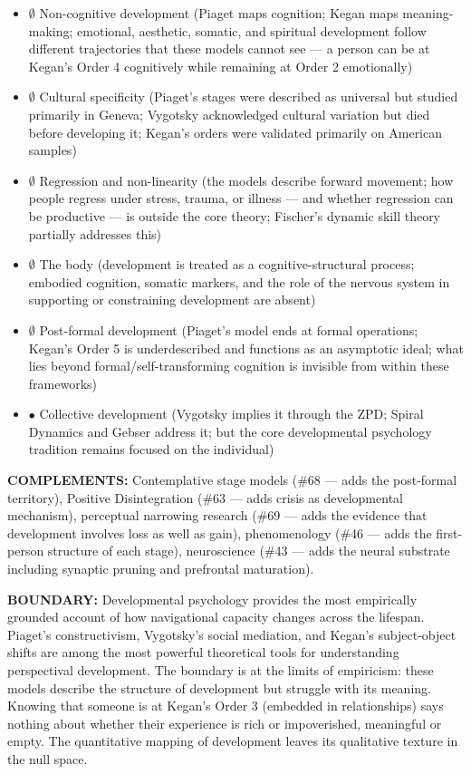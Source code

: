 \begin{itemize}[nosep,leftmargin=*]
  \item $\emptyset$ Non-cognitive development (Piaget maps cognition; Kegan maps meaning-making; emotional, aesthetic, somatic, and spiritual development follow different trajectories that these models cannot see — a person can be at Kegan's Order 4 cognitively while remaining at Order 2 emotionally)
  \item $\emptyset$ Cultural specificity (Piaget's stages were described as universal but studied primarily in Geneva; Vygotsky acknowledged cultural variation but died before developing it; Kegan's orders were validated primarily on American samples)
  \item $\emptyset$ Regression and non-linearity (the models describe forward movement; how people regress under stress, trauma, or illness — and whether regression can be productive — is outside the core theory; Fischer's dynamic skill theory partially addresses this)
  \item $\emptyset$ The body (development is treated as a cognitive-structural process; embodied cognition, somatic markers, and the role of the nervous system in supporting or constraining development are absent)
  \item $\emptyset$ Post-formal development (Piaget's model ends at formal operations; Kegan's Order 5 is underdescribed and functions as an asymptotic ideal; what lies beyond formal/self-transforming cognition is invisible from within these frameworks)
  \item $\bullet$ Collective development (Vygotsky implies it through the ZPD; Spiral Dynamics and Gebser address it; but the core developmental psychology tradition remains focused on the individual)
\end{itemize}


\textbf{COMPLEMENTS:} Contemplative stage models (\#68 — adds the post-formal territory), Positive Disintegration (\#63 — adds crisis as developmental mechanism), perceptual narrowing research (\#69 — adds the evidence that development involves loss as well as gain), phenomenology (\#46 — adds the first-person structure of each stage), neuroscience (\#43 — adds the neural substrate including synaptic pruning and prefrontal maturation).


\textbf{BOUNDARY:} Developmental psychology provides the most empirically grounded account of how navigational capacity changes across the lifespan. Piaget's constructivism, Vygotsky's social mediation, and Kegan's subject-object shifts are among the most powerful theoretical tools for understanding perspectival development. The boundary is at the limits of empiricism: these models describe the structure of development but struggle with its meaning. Knowing that someone is at Kegan's Order 3 (embedded in relationships) says nothing about whether their experience is rich or impoverished, meaningful or empty. The quantitative mapping of development leaves its qualitative texture in the null space.



